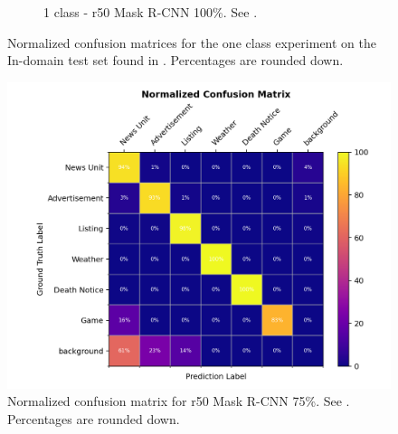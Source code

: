 \documentclass[oneside, english, bibtex]{kththesis}
\begin{document}
\begin{figure}[!htb]
\begin{adjustbox}{center,max size={\textwidth}{0.9\textheight}}
{\begin{subfigure}{0.75\textwidth}
  \caption{1 class - r50 Mask R-CNN 100\%. See .}
  \label{fig:vanilla_1c_1.0_inset}
\end{subfigure}}
\end{adjustbox}
  \caption{Normalized confusion matrices for the one class experiment on the In-domain test set found in . Percentages are rounded down.}
\label{fig:oneclassconfusions}
\end{figure}


\begin{figure}[H]
\begin{adjustbox}{center,max size={\textwidth}{0.9\textheight}}
\parbox{1.5\textwidth}{\lineskip=0pt
  \centering
  \includegraphics[width=\linewidth, clip=true, trim = 0mm 0mm 0mm 0mm]{figures/confusions/vanilla_0.75_inset.png}
}
\end{adjustbox}
  \caption{Normalized confusion matrix for r50 Mask R-CNN 75\%. See . Percentages are rounded down.}
\label{fig:vanilla_0.75_inset_cm}
\end{figure}
\end{document}

